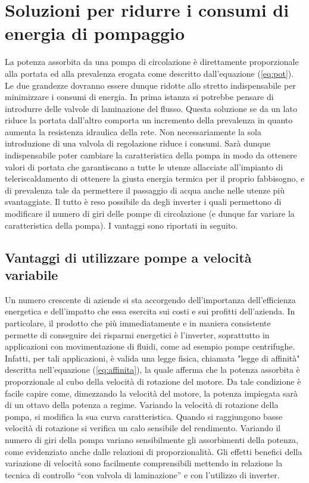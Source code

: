 \documentclass[laurea,oneside,11pt]{USiena_tesiLM}
\begin{document}
\section{Soluzioni per ridurre i consumi di energia di pompaggio}
La potenza assorbita da una pompa di circolazione è direttamente proporzionale alla portata ed alla prevalenza erogata come descritto dall'equazione (\ref{eq:pot}). Le due grandezze dovranno essere dunque ridotte allo stretto indispensabile per minimizzare i consumi di energia.
In prima istanza si potrebbe pensare di introdurre delle valvole di laminazione del flusso. Questa soluzione se da un lato riduce la portata dall'altro comporta un incremento della prevalenza in quanto aumenta la resistenza idraulica della rete.
Non necessariamente la sola introduzione di una valvola di regolazione riduce i consumi. Sarà dunque indispensabile poter cambiare la caratteristica della pompa in modo da ottenere  valori di portata che garantiscano a tutte le utenze allacciate all'impianto di teleriscaldamento di ottenere la giusta energia termica per il proprio fabbisogno, e di prevalenza tale da permettere il passaggio di acqua anche nelle utenze più svantaggiate.
Il tutto è reso possibile da degli inverter i quali permettono di modificare il numero di giri delle pompe di circolazione (e dunque far variare la caratteristica della pompa). I vantaggi sono riportati in seguito.

\subsection{Vantaggi di utilizzare pompe a velocità variabile}
Un numero crescente di aziende si sta accorgendo dell'importanza dell'efficienza energetica e dell'impatto che essa esercita sui costi e sui profitti dell'azienda.
In particolare, il prodotto che più immediatamente e in maniera consistente permette di conseguire dei risparmi energetici è l'inverter, soprattutto in applicazioni con movimentazione di fluidi, come ad esempio pompe centrifughe. Infatti, per tali applicazioni, è valida una legge fisica, chiamata "legge di affinità" descritta nell'equazione (\ref{eq:affinita}), la quale afferma che la potenza assorbita è proporzionale al cubo della velocità di rotazione del motore. Da tale condizione è facile capire come, dimezzando la velocità del motore, la potenza impiegata sarà di un ottavo della potenza a regime. 
Variando la velocità di rotazione della pompa, si modifica la sua curva caratteristica. Quando si raggiungono basse velocità di rotazione si verifica un calo sensibile del rendimento. Variando il numero di giri della pompa variano sensibilmente gli assorbimenti della potenza, come evidenziato anche dalle relazioni di proporzionalità. Gli effetti benefici della variazione di velocità sono facilmente comprensibili mettendo in relazione la tecnica di controllo “con valvola di laminazione” e con l’utilizzo di inverter. 
\end{document}
